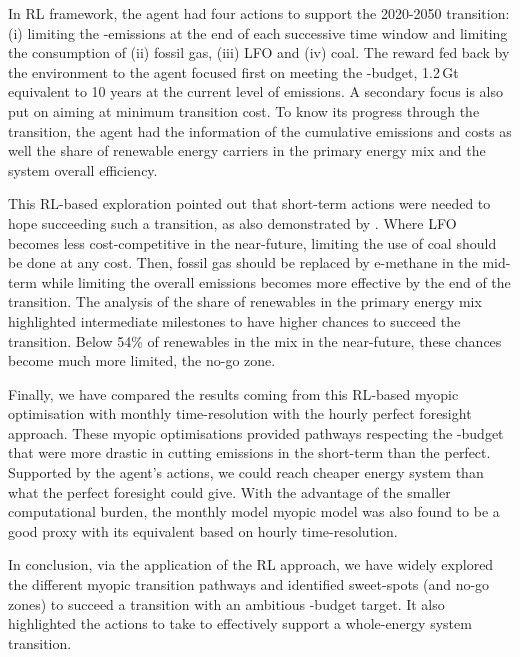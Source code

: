In \gls{RL} framework, the agent had four actions to support the 2020-2050 transition: (i) limiting the -emissions at the end of each successive time window and limiting the consumption of (ii) fossil gas, (iii) \acrfull{LFO} and (iv) coal. The reward fed back by the environment to the agent focused first on meeting the -budget, 1.2\,Gt equivalent to 10 years at the current level of emissions. A secondary focus is also put on aiming at minimum transition cost. To know its progress through the transition, the agent had the information of the cumulative emissions and costs as well the share of renewable energy carriers in the primary energy mix and the system overall efficiency.

This \gls{RL}-based exploration pointed out that short-term actions were needed to hope succeeding such a transition, as also demonstrated by \citet{luderer2018residual}. Where \gls{LFO} becomes less cost-competitive in the near-future, limiting the use of coal should be done at any cost. Then, fossil gas should be replaced by e-methane in the mid-term while limiting the overall emissions becomes more effective by the end of the transition. The analysis of the share of renewables in the primary energy mix highlighted intermediate milestones to have higher chances to succeed the transition. Below 54\% of renewables in the mix in the near-future, these chances become much more limited, \ie the no-go zone. 

Finally, we have compared the results coming from this \gls{RL}-based myopic optimisation with monthly time-resolution with the hourly perfect foresight approach. These myopic optimisations provided pathways respecting the -budget that were more drastic in cutting emissions in the short-term than the perfect. Supported by the agent's actions, we could reach cheaper energy system than what the perfect foresight could give. With the advantage of the smaller computational burden, the monthly model myopic model was also found to be a good proxy with its equivalent based on hourly time-resolution.

In conclusion, via the application of the \gls{RL} approach, we have widely explored the different myopic transition pathways and identified sweet-spots (and no-go zones) to succeed a transition with an ambitious -budget target. It also highlighted the actions to take to effectively support a whole-energy system transition.